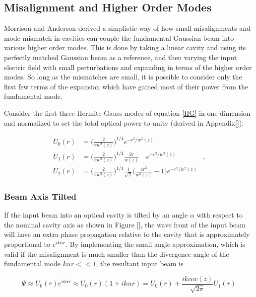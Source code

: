 		\subsection{Misalignment and Higher Order Modes}\label{Misalign}
		Morrison and Anderson \cite{Anderson} \cite{Morrison} derived a simplistic way of how small misalignments and mode mismatch in cavities can couple the fundamental Gaussian beam into various higher order modes.  This is done by taking a linear cavity and using its perfectly matched Gaussian beam as a reference, and then varying the input electric field with small perturbations and expanding in terms of the higher order modes.  So long as the mismatches are small, it is possible to consider only the first few terms of the expansion which have gained most of their power from the fundamental mode.
		
		Consider the first three Hermite-Gauss modes of equation \ref{HG} in one dimension and normalized to set the total optical power to unity (derived in Appendix[]):

		\begin{equation}
		\label{Gauss1D}
		\begin{aligned}
				U_{0}(r) & =	\bigg( \frac{2}{\pi w^2(z)} \bigg)^{1/4}  e^{-r^2/w^2(z)}		&
		\\		U_{1}(r) &	=	\bigg( \frac{2}{\pi w^2(z)} \bigg)^{1/4}  \frac{2r}{w(z)} \quad e^{-r^2/w^2(z)}&,
		\\	 	U_{2}(r) &	=	\bigg( \frac{2}{\pi w^2(z)} \bigg)^{1/4}  \frac{1}{\sqrt{2}} \bigg( \frac{4r^2}{w^2(z)} - 1 \bigg)   e^{-r^2/w^2(z)}
		\end{aligned}
		\end{equation}
				
		
		\subsubsection{Beam Axis Tilted}
		If the input beam into an optical cavity is tilted by an angle $\alpha$ with respect to the nominal cavity axis as shown in Figure [], the wave front of the input beam will have an extra phase propagation relative to the cavity that is approximately proportional to $e^{ik \alpha r}$.  By implementing the small angle approximation, which is valid if the misalignment is much smaller than the divergence angle of the fundamental mode $k \alpha r << 1$, the resultant input beam is
		
		\begin{equation}
		\Psi \approx U_{0}(r) e^{ik \alpha r} \approx U_{0}(r) ( 1 + ik \alpha r ) =  U_{0}(r) + \frac{ik \alpha w(z)}{\sqrt{2\pi}} U_{1}(r)
		\end{equation}
		
